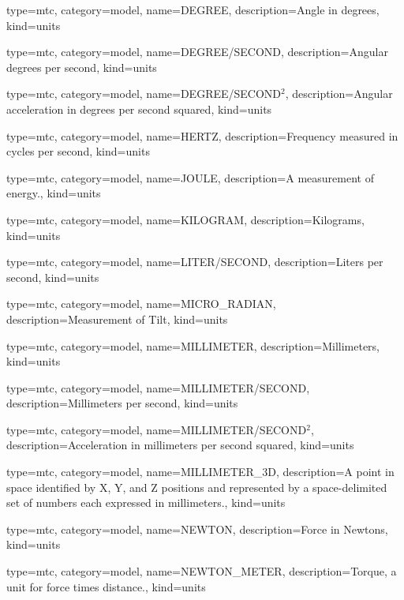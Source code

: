 {
  type=mtc,
  category=model,
  name={DEGREE},
  description={Angle in degrees},
  kind={units}
}


{
  type=mtc,
  category=model,
  name={DEGREE/SECOND},
  description={Angular degrees per second},
  kind={units}
}


{
  type=mtc,
  category=model,
  name={DEGREE/SECOND$^2$},
  description={Angular acceleration in degrees per second squared},
  kind={units}
}


{
  type=mtc,
  category=model,
  name={HERTZ},
  description={Frequency measured in cycles per second},
  kind={units}
}


{
  type=mtc,
  category=model,
  name={JOULE},
  description={A measurement of energy.},
  kind={units}
}


{
  type=mtc,
  category=model,
  name={KILOGRAM},
  description={Kilograms},
  kind={units}
}



{
  type=mtc,
  category=model,
  name={LITER/SECOND},
  description={Liters per second},
  kind={units}
}


{
  type=mtc,
  category=model,
  name={MICRO\_RADIAN},
  description={Measurement of Tilt},
  kind={units}
}


{
  type=mtc,
  category=model,
  name={MILLIMETER},
  description={Millimeters},
  kind={units}
}


{
  type=mtc,
  category=model,
  name={MILLIMETER/SECOND},
  description={Millimeters per second},
  kind={units}
}


{
  type=mtc,
  category=model,
  name={MILLIMETER/SECOND$^2$},
  description={Acceleration in millimeters per second squared},
  kind={units}
}


{
  type=mtc,
  category=model,
  name={MILLIMETER\_3D},
  description={A point in space identified by X, Y, and Z positions and represented by a space-delimited set of numbers each expressed in millimeters.},
  kind={units}
}


{
  type=mtc,
  category=model,
  name={NEWTON},
  description={Force in Newtons},
  kind={units}
}


{
  type=mtc,
  category=model,
  name={NEWTON\_METER},
  description={Torque, a unit for force times distance.},
  kind={units}
}


